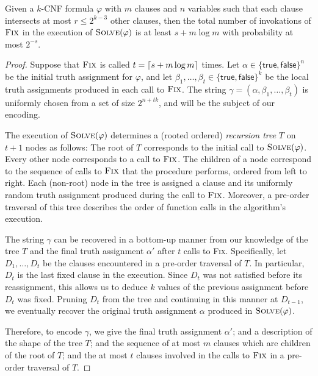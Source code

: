 \documentclass[prodmode,acmcsur]{acmsmall}
\begin{document}
\begin{thm}
%
  Given a $k$-CNF formula $\varphi$ with $m$ clauses and $n$ variables
  such that each clause intersects at most $r \le 2^{k - 3}$ other
  clauses, then the total number of invokations of $\textsc{Fix}$ in
  the execution of $\textsc{Solve}(\varphi)$ is at least
  $s + m \log m$ with probability at most $2^{-s}$.
\end{thm}
\begin{proof}
  Suppose that $\textsc{Fix}$ is called 
  $t = {\lceil s + m\log m \rceil}$ times. Let
  $\alpha \in \{\textsf{true}, \textsf{false}\}^n$ be the initial
  truth assignment for $\varphi$, and let
  $\beta_1, \ldots, \beta_t \in \{\textsf{true}, \textsf{false}\}^k$
  be the local truth assignments produced in each call to
  $\textsc{Fix}$. The string
  $\gamma = (\alpha, \beta_1, \ldots, \beta_t)$ is uniformly chosen
  from a set of size $2^{n + tk}$, and will be the subject of our
  encoding.

  The execution of $\textsc{Solve}(\varphi)$ determines a (rooted
  ordered) \emph{recursion tree} $T$ on $t + 1$ nodes as follows: The
  root of $T$ corresponds to the initial call to
  $\textsc{Solve}(\varphi)$. Every other node corresponds to a call
  to $\textsc{Fix}$. The children of a node correspond 
   to the sequence of calls to $\textsc{Fix}$ that the procedure
  performs, ordered from left to right.
  Each (non-root) node in the tree is assigned a clause
  and its uniformly random truth assignment produced during the call
  to $\textsc{Fix}$. Moreover, a pre-order traversal of this tree
  describes the order of function calls in the algorithm's execution.

  The string $\gamma$ can be recovered in a bottom-up manner from our
  knowledge of the tree $T$ and the final truth assignment
  $\alpha'$ after $t$ calls to \textsc{Fix}. 
  Specifically, let $D_1, \dots, D_t$ be the clauses
  encountered in a pre-order traversal of $T$. In particular, $D_t$ is
  the last fixed clause in the execution. Since $D_t$ was not
  satisfied before its reassignment, this allows us to deduce $k$
  values of the previous assignment
  before $D_t$ was fixed. Pruning $D_t$ from the tree and continuing
  in this manner at $D_{t - 1}$, we eventually recover the original
  truth assignment $\alpha$ produced in $\textsc{Solve}(\varphi)$.

  Therefore, to encode $\gamma$, we give the final truth
  assignment $\alpha'$; and a description of the shape of the tree
  $T$; and the sequence of at most $m$ clauses which are children of
  the root of $T$; and the at most $t$ clauses involved in the calls
  to $\textsc{Fix}$ in a pre-order traversal of $T$.  


\end{proof}
\end{document}
